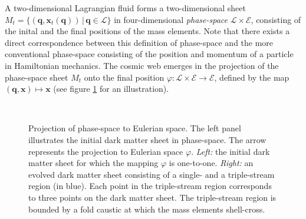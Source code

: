 \documentclass[a4paper, 11pt]{article}
\begin{document}
A two-dimensional Lagrangian fluid forms a two-dimensional sheet $M_t=\{(\bm{q},\bm{x}_t(\bm{q})) \, |\, \bm{q}\in \mathcal{L}\}$ in four-dimensional \textit{phase-space} $\mathcal{L}\times \mathcal{E}$, consisting of the inital and the final positions of the mass elements. Note that there exists a direct correspondence between this definition of phase-space and the more conventional phase-space consisting of the position and momentum of a particle in Hamiltonian mechanics. The cosmic web emerges in the projection of the phase-space sheet $M_t$ onto the final position $\varphi:\mathcal{L}\times \mathcal{E} \to \mathcal{E}$, defined by the map $(\bm{q},\bm{x}) \mapsto\bm{x}$ (see figure \ref{fig:Phase-Space} for an illustration).
\begin{figure}
\centering
\begin{subfigure}[b]{0.49\textwidth}
\end{subfigure}~
\begin{subfigure}[b]{0.49\textwidth}
\end{subfigure}
\caption{Projection of phase-space to Eulerian space. The left panel illustrates the initial dark matter sheet in phase-space. The arrow represents the projection to Eulerian space $\varphi$. \textit{Left:} the initial dark matter sheet for which the mapping $\varphi$ is one-to-one. \textit{Right:} an evolved dark matter sheet consisting of a single- and a triple-stream region (in blue). Each point in the triple-stream region corresponds to three points on the dark matter sheet. The triple-stream region is bounded by a fold caustic at which the mass elements shell-cross.}\label{fig:Phase-Space}
\end{figure}
\end{document}
